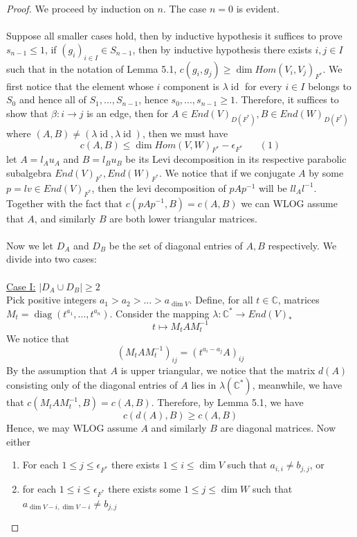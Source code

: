 \documentclass[12pt]{amsart}
\theoremstyle{plain}
\theoremstyle{definition}
\theoremstyle{remark}
\begin{document}
\begin{proof}
We proceed by induction on $n$. The case $n=0$ is evident.
\\~\\ Suppose all smaller cases hold, then by inductive hypothesis it suffices to prove $s_{n-1}\leq1$, if $(g_i)_{i\in I}\in S_{n-1}$, then by inductive hypothesis there exists $i,j\in I$ such that in the notation of Lemma 5.1, $c(g_i,g_j)\geq \dim Hom(V_i,V_j)_{F^*}$. 
We first notice that the element whose $i$ component is $\lambda \operatorname{id}$ for every $i\in I$ belongs to $S_0$ and hence all of $S_1,...,S_{n-1}$, hence $s_0,...,s_{n-1}\geq 1$. Therefore, it suffices to show that $\beta:i\to j$ is an edge, then for $A\in End(V)_{D(F^*)},B\in End(W)_{D(F^*)}$ where $(A,B)\neq (\lambda \operatorname{id},\lambda\operatorname{id})$, then we must have
$$c(A,B)\leq \dim Hom(V,W)_{F^*}-\epsilon_{F^*}\hspace{20pt}(1)$$
let $A=l_Au_A$ and $B=l_Bu_B$ be its Levi decomposition in its respective parabolic subalgebra $End(V)_{F^*},End(W)_{F^*}$. We notice that if we conjugate $A$ by some $p=lv\in End(V)_{F^*}$, then the levi decomposition of $pAp^{-1}$ will be $ll_Al^{-1}$. Together with the fact that $c(pAp^{-1},B)=c(A,B)$ we can WLOG assume that $A$, and similarly $B$ are both lower triangular matrices.
\\~\\ Now we let $D_A$ and $D_B$ be the set of diagonal entries of $A,B$ respectively. We divide into two cases:
\\~\\\underline{Case I:} $|D_{A}\cup D_B|\geq 2$
\\ Pick positive integers $a_1>a_2>...>a_{\dim V}$. Define, for all $t\in\mathbb C$, matrices $M_t=\operatorname{diag}(t^{a_1},...,t^{a_n})$. Consider the mapping $\lambda:\mathbb C^*\to End(V)_{*}$ 
$$t\mapsto M_tAM_t^{-1}$$
We notice that 
$$(M_tAM_t^{-1})_{ij}=(t^{a_i-a_j}A)_{ij}$$
By the assumption that $A$ is upper triangular, we notice that the matrix $d(A)$ consisting only of the diagonal entries of $A$ lies in $\lambda(\mathbb C^*)$, meanwhile, we have that $c(M_tAM_t^{-1},B)=c(A,B)$.
Therefore, by Lemma 5.1, we have 
$$c(d(A),B)\geq c(A,B)$$
Hence, we may WLOG assume $A$ and similarly $B$ are diagonal matrices. Now  either
\begin{enumerate}
    \item[(i)] For each $1\leq j\leq \epsilon_{F^*}$ there exists $1\leq i\leq \dim V$ such that $a_{i,i}\neq b_{j,j}$, or
    \item[(ii)] for each $1\leq i\leq \epsilon_{F^*}$ there exists some $1\leq j\leq \dim W$ such that $a_{\dim V-i,\dim V-i}\neq b_{j,j}$

\end{enumerate}
\end{proof}
\end{document}
